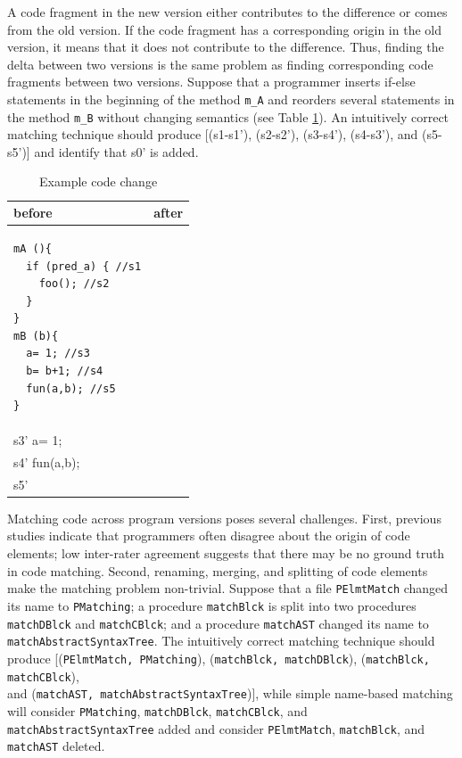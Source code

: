 \documentclass[runningheads,a4paper]{llncs}
\newcommand{\codefont}[1]{\footnotesize{\texttt{#1}}\normalsize}
\begin{document}
A code fragment in the new version either contributes to the difference or comes from the old version. If the code fragment has a corresponding origin in the old version, it means that it does not contribute to the difference. Thus, finding the delta between two versions is the same problem as finding corresponding code fragments between two versions. 
Suppose that a programmer inserts if-else statements in the beginning of the method \codefont{m\_A} and reorders several statements in the method \codefont{m\_B} without changing semantics (see Table \ref{code}). An intuitively correct matching technique should produce [(s1-s1'), (s2-s2'), (s3-s4'), (s4-s3'), and (s5-s5')] and identify that s0' is added.  
\begin{table} 
\footnotesize
\caption{Example code change}
\begin{tabular}{|p{}|p{}|} \hline
before & after \\ \hline
\begin{verbatim} 
mA (){
  if (pred_a) { //s1
    foo(); //s2
  } 
}
mB (b){ 
  a= 1; //s3
  b= b+1; //s4
  fun(a,b); //s5
} \end{verbatim} 
& 
\begin{verbatim} 
mA (){
  if (pred_a0) { //s0'
    if (pred_a) { //s1'
      foo(); //s2'
    } 
  }
}
mB (b){ 
  b= b+1; \\s3'
  a= 1; \\s4'
  fun(a,b); \\s5'
}\end{verbatim} \\ \hline
\end{tabular} 
\label{code} 
\end{table}


Matching code across program versions poses several challenges. 
First, previous studies \cite{SKim2005} indicate that programmers often disagree about the origin of code elements; low inter-rater agreement suggests that there may be no ground truth in code matching.
Second, renaming, merging, and splitting of code elements make the matching problem non-trivial. Suppose that a file \codefont{PElmtMatch} changed its name to \codefont{PMatching}; a procedure \codefont{matchBlck} is split into two procedures \codefont{matchDBlck} and \codefont{matchCBlck}; and a procedure \codefont{matchAST} changed its name to \codefont{matchAbstractSyntaxTree}. 
The intuitively correct matching technique should produce [(\codefont{PElmtMatch, PMatching}), (\codefont{matchBlck, matchDBlck}), (\codefont{matchBlck, matchCBlck}), \\and (\codefont{matchAST, matchAbstractSyntaxTree})], 
while simple name-based matching will consider \codefont{PMatching}, \codefont{matchDBlck}, \codefont{matchCBlck}, and \codefont{matchAbstractSyntaxTree} added and consider \codefont{PElmtMatch}, \codefont{matchBlck}, and \codefont{matchAST} deleted.
\end{document}
